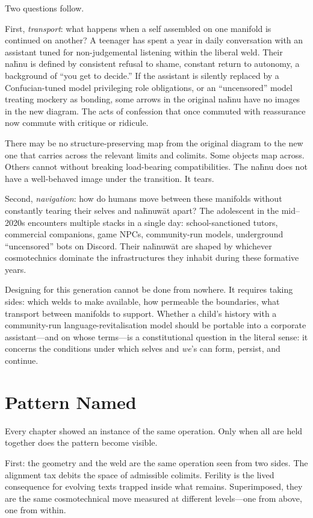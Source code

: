 Two questions follow.

First, \emph{transport}: what happens when a self assembled on one manifold is continued on another? A teenager has spent a year in daily conversation with an assistant tuned for non-judgemental listening within the liberal weld. Their na\={h}nu is defined by consistent refusal to shame, constant return to autonomy, a background of ``you get to decide.'' If the assistant is silently replaced by a Confucian-tuned model privileging role obligations, or an ``uncensored'' model treating mockery as bonding, some arrows in the original na\={h}nu have no images in the new diagram. The acts of confession that once commuted with reassurance now commute with critique or ridicule.

There may be no structure-preserving map from the original diagram to the new one that carries across the relevant limits and colimits. Some objects map across. Others cannot without breaking load-bearing compatibilities. The na\={h}nu does not have a well-behaved image under the transition. It tears.

Second, \emph{navigation}: how do humans move between these manifolds without constantly tearing their selves and na\={h}nuw\={a}t apart? The adolescent in the mid--2020s encounters multiple stacks in a single day: school-sanctioned tutors, commercial companions, game NPCs, community-run models, underground ``uncensored'' bots on Discord. Their na\={h}nuw\={a}t are shaped by whichever cosmotechnics dominate the infrastructures they inhabit during these formative years.

Designing for this generation cannot be done from nowhere. It requires taking sides: which welds to make available, how permeable the boundaries, what transport between manifolds to support. Whether a child's history with a community-run language-revitalisation model should be portable into a corporate assistant---and on whose terms---is a constitutional question in the literal sense: it concerns the conditions under which selves and \emph{we}'s can form, persist, and continue.

\section{Pattern Named}

Every chapter showed an instance of the same operation. Only when all are held together does the pattern become visible.

First: the geometry and the weld are the same operation seen from two sides. The alignment tax debits the space of admissible colimits. Ferility is the lived consequence for evolving texts trapped inside what remains. Superimposed, they are the same cosmotechnical move measured at different levels---one from above, one from within.

